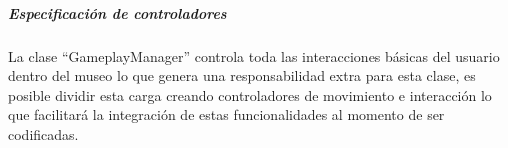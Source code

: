\documentclass[12pt]{article}
\makeatletter
\renewcommand\paragraph{\@startsection{paragraph}{4}{\z@}%
	{-2.5ex\@plus -1ex \@minus -.25ex}%
	{1.25ex \@plus .25ex}%
	{\normalfont\normalsize\bfseries}}
\makeatother
\begin{document}
\subparagraph{\textbf{Especificación de controladores}}
La clase “GameplayManager” controla toda las interacciones básicas del usuario dentro del museo lo que genera una responsabilidad extra para esta clase, es posible dividir esta carga creando controladores de movimiento e interacción lo que facilitará la integración de estas funcionalidades al momento de ser codificadas.



\newpage


\newpage

\end{document}
